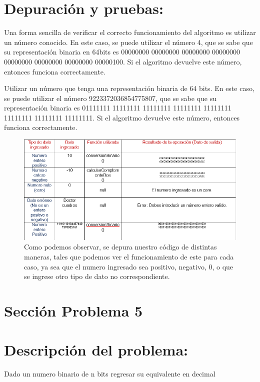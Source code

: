 \documentclass{IEEEcsmag}
\begin{document}
\section*{Depuración y pruebas:}
Una forma sencilla de verificar el correcto funcionamiento del algoritmo es utilizar un número conocido. En este caso, se puede utilizar el número 4, que se sabe que su representación binaria en 64bits es 00000000 00000000 00000000 00000000 00000000 00000000 00000000 00000100. Si el algoritmo devuelve este número, entonces funciona correctamente.

Utilizar un número que tenga una representación binaria de 64 bits. En este caso, se puede utilizar el número 9223372036854775807, que se sabe que su representación binaria es 01111111 11111111 11111111 11111111 11111111 11111111 11111111 11111111. Si el algoritmo devuelve este número, entonces funciona correctamente.

\begin{figure}[h!]
    \centering
    \includegraphics[width=1.0\linewidth\centering]{./latex-imagenes/tablaDePruebas.png}
 
    \caption{Como podemos observar, se depura nuestro código de distintas maneras, tales que podemos ver el  funcionamiento de este para cada caso, ya sea que el numero ingresado sea positivo, negativo, 0, o que se ingrese otro tipo de dato no correspondiente.}
    \label{fig: Depuraciones.}
\end{figure}

\section{Sección Problema 5}

\section*{Descripción del problema:  }
Dado un numero binario de n bits regresar su equivalente en decimal
\end{document}
